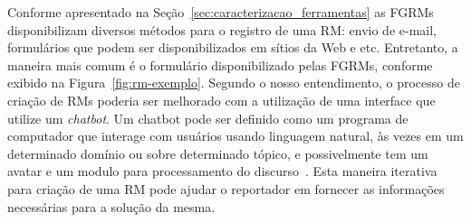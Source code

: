 Conforme apresentado na Seção~\ref{sec:caracterizacao_ferramentas} as FGRMs
disponibilizam diversos métodos para o registro de uma RM\@: envio de e-mail,
formulários que podem ser disponibilizados em sítios da Web e etc. Entretanto, a
maneira mais comum é o formulário disponibilizado pelas FGRMs, conforme exibido
na Figura~\ref{fig:rm-exemplo}. Segundo o nosso entendimento, o processo de
criação de RMs poderia ser melhorado com a utilização de uma interface que
utilize um \textit{chatbot}. Um chatbot pode ser definido como um programa de
computador que interage com usuários usando linguagem natural, às vezes em um
determinado domínio ou sobre determinado tópico, e possivelmente tem um avatar e
um modulo para processamento do
discurso~\cite{mauldin1994chatterbots,huang2007extracting}. Esta maneira
iterativa para criação de uma RM pode ajudar o reportador em fornecer as
informações necessárias para a solução da mesma.
